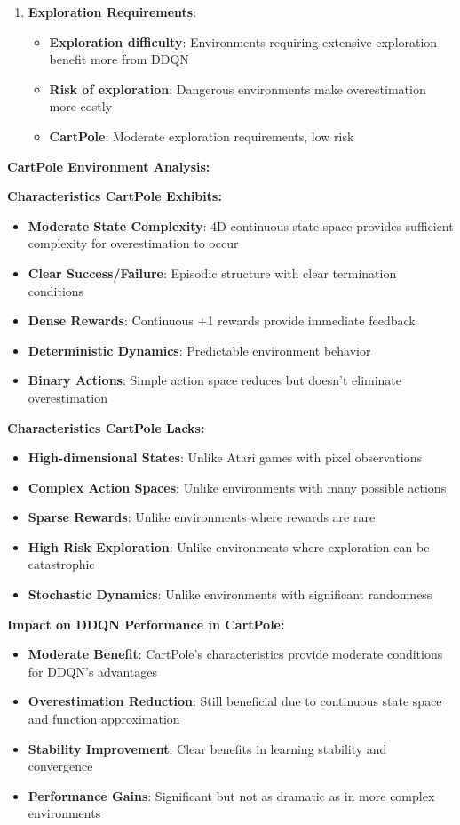 \documentclass[12pt]{article}
\begin{document}
{{{\begin{enumerate}
    \item \textbf{Exploration Requirements}:
    \begin{itemize}
        \item \textbf{Exploration difficulty}: Environments requiring extensive exploration benefit more from DDQN
        \item \textbf{Risk of exploration}: Dangerous environments make overestimation more costly
        \item \textbf{CartPole}: Moderate exploration requirements, low risk
    \end{itemize}
\end{enumerate}

\textbf{CartPole Environment Analysis:}

\textbf{Characteristics CartPole Exhibits:}
\begin{itemize}
    \item \textbf{Moderate State Complexity}: 4D continuous state space provides sufficient complexity for overestimation to occur
    \item \textbf{Clear Success/Failure}: Episodic structure with clear termination conditions
    \item \textbf{Dense Rewards}: Continuous +1 rewards provide immediate feedback
    \item \textbf{Deterministic Dynamics}: Predictable environment behavior
    \item \textbf{Binary Actions}: Simple action space reduces but doesn't eliminate overestimation
\end{itemize}

\textbf{Characteristics CartPole Lacks:}
\begin{itemize}
    \item \textbf{High-dimensional States}: Unlike Atari games with pixel observations
    \item \textbf{Complex Action Spaces}: Unlike environments with many possible actions
    \item \textbf{Sparse Rewards}: Unlike environments where rewards are rare
    \item \textbf{High Risk Exploration}: Unlike environments where exploration can be catastrophic
    \item \textbf{Stochastic Dynamics}: Unlike environments with significant randomness
\end{itemize}

\textbf{Impact on DDQN Performance in CartPole:}
\begin{itemize}
    \item \textbf{Moderate Benefit}: CartPole's characteristics provide moderate conditions for DDQN's advantages
    \item \textbf{Overestimation Reduction}: Still beneficial due to continuous state space and function approximation
    \item \textbf{Stability Improvement}: Clear benefits in learning stability and convergence
    \item \textbf{Performance Gains}: Significant but not as dramatic as in more complex environments
\end{itemize}

}}}
\end{document}
